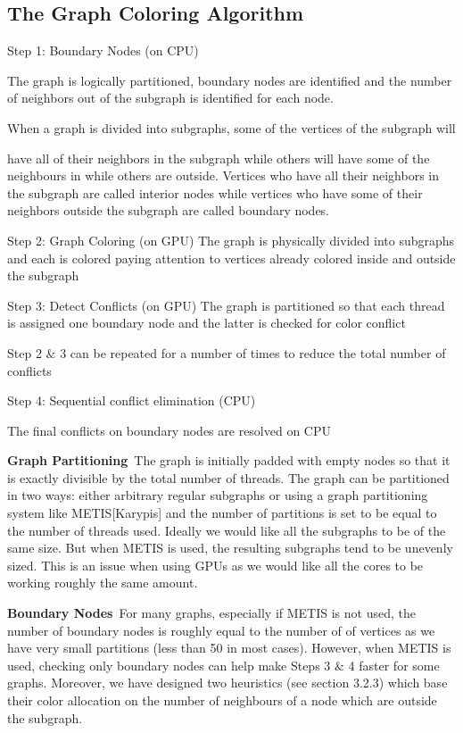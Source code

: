 \documentclass[preprint]{sigplanconf}
\begin{document}
\subsection{The Graph Coloring Algorithm}
Step 1: Boundary Nodes (on CPU)

The graph is logically partitioned, boundary nodes are identified and the number         of neighbors out of the subgraph is identified for each node.

When a graph is divided into subgraphs, some of the vertices of the subgraph will

have all of their neighbors in the subgraph while others will have some of the         neighbours in while others are outside. Vertices who have all their neighbors in         the subgraph are called interior nodes while vertices who have some of their         neighbors outside the subgraph are called boundary nodes.

Step 2: Graph Coloring (on GPU)
        The graph is physically divided into subgraphs and each is colored paying                 attention to vertices already colored inside and outside the subgraph

Step 3: Detect Conflicts (on GPU)
        The graph is partitioned so that each thread is assigned one boundary node and             the latter is checked for color conflict

Step 2 $\&$ 3 can be repeated for a number of times to reduce the total number of conflicts

Step 4: Sequential conflict elimination (CPU)

The final conflicts on boundary nodes are resolved on CPU 

\textbf{Graph Partitioning}\
The graph is initially padded with empty nodes so that it is exactly divisible by the total number of threads. The graph can be partitioned in two ways: either arbitrary regular subgraphs or using a graph partitioning system like METIS[Karypis] and the number of partitions is set to be equal to the number of threads used.
Ideally we would like all the subgraphs to be of the same size. But when METIS is used, the resulting subgraphs tend to be unevenly sized. This is an issue when using GPUs as we would like all the cores to be working roughly the same amount.\

\textbf{Boundary Nodes}\
For many graphs, especially if METIS is not used, the number of boundary nodes is roughly equal to the number of of vertices as we have very small partitions (less than 50 in most cases). However, when METIS is used, checking only boundary nodes can help make Steps 3 $\&$ 4 faster for some graphs.
Moreover, we have designed two heuristics (see section 3.2.3) which base their color allocation on the number of neighbours of a node which are outside the subgraph.\
\end{document}
